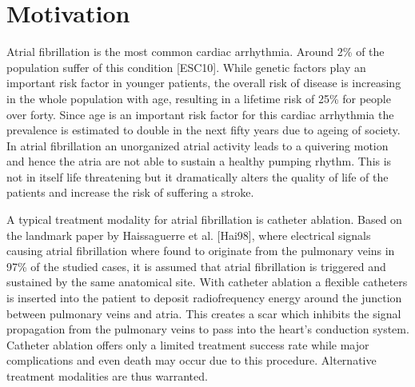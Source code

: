 \documentclass[type=dr, dr=rernat, accentcolor=tud7b,colorbacktitle, bigchapter, openright, twoside, 12pt ]{tudthesis}
\begin{document}
% 
% 
% 


\chapter*{Motivation}

Atrial fibrillation is the most common cardiac arrhythmia. Around 2\% of the population suffer of this condition [ESC10]. 
While genetic factors play an important risk factor in younger patients, the overall risk of disease is increasing in the whole population 
with age, resulting in a lifetime risk of 25\% for people over forty. Since age is an important risk factor for this cardiac arrhythmia the 
prevalence is estimated to double in the next fifty years due to ageing of society. In atrial fibrillation an unorganized atrial activity 
leads to a quivering motion and hence the atria are not able to sustain a healthy pumping rhythm. This is not in itself life threatening but 
it dramatically alters the quality of life of the patients and increase the risk of suffering a stroke.\newline

A typical treatment modality for atrial fibrillation is catheter ablation. Based on the landmark paper by Haissaguerre et al. [Hai98], where 
electrical signals causing atrial fibrillation where found to originate from the pulmonary veins in 97\% of the studied cases, it is assumed 
that atrial fibrillation is triggered and sustained by the same anatomical site. With catheter ablation a flexible catheters is inserted into 
the patient to deposit radiofrequency energy around the junction between pulmonary veins and atria. This creates a scar which inhibits the 
signal propagation from the pulmonary veins to pass into the heart's conduction system. Catheter ablation offers only a limited treatment 
success rate while major complications and even death may occur due to this procedure. Alternative treatment modalities are thus warranted.\newline
\end{document}
